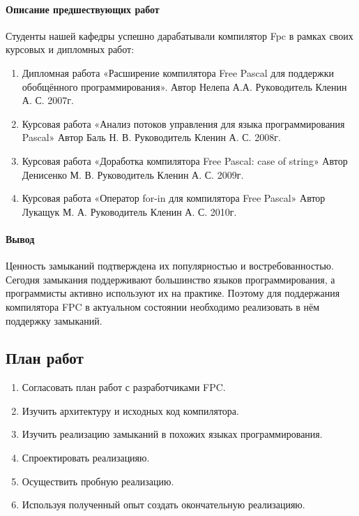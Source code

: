 \documentclass{imcs}
\begin{document}
\paragraph{Описание предшествующих работ}
Студенты нашей кафедры успешно дарабатывали компилятор Fpc в рамках своих
курсовых и дипломных работ:
\begin{enumerate}
    \item Дипломная работа «Расширение компилятора Free Pascal для поддержки
обобщённого программирования». Автор Нелепа А.А. Руководитель Кленин А. С.
2007г.
    \item Курсовая работа «Анализ потоков управления для языка программирования Pascal» Автор Баль Н. В. Руководитель Кленин А. С. 2008г.
    \item Курсовая работа «Доработка компилятора Free Pascal: case of string» Автор Денисенко М. В. Руководитель Кленин А. С. 2009г.
    \item Курсовая работа «Оператор for-in для компилятора Free Pascal» Автор Лукащук М.
А. Руководитель Кленин А. С. 2010г.
\end{enumerate}

\paragraph{Вывод}
Ценность замыканий подтверждена их популярностью и востребованностью. 
Сегодня замыкания поддерживают большинство языков программирования, а программисты 
активно используют их на практике. Поэтому для поддержания компилятора FPC в 
актуальном состоянии необходимо реализовать в нём поддержку замыканий.

\subsection{План работ}

\begin{enumerate}
    \item Согласовать план работ с разработчиками FPC.
    \item Изучить архитектуру и исходных код компилятора.
    \item Изучить реализацию замыканий в похожих языках программирования.
    \item Спроектировать реализацияю.
    \item Осуществить пробную реализацию.
    \item Используя полученный опыт создать окончательную реализацияю.
\end{enumerate}
\end{document}
